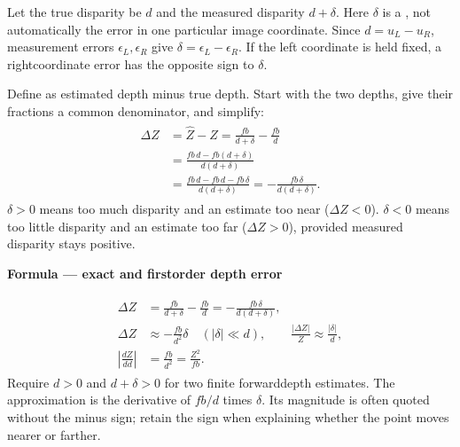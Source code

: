 \documentclass[letterpaper,11pt,english,openany,oneside]{jupyterBook}
\begin{document}
\sphinxAtStartPar
Let the true disparity be \(d\) and the measured disparity \(d+\delta\). Here \(\delta\) is a , not automatically the error in one particular image coordinate. Since \(d=u_L-u_R\), measurement errors \(\epsilon_L,\epsilon_R\) give \(\delta=\epsilon_L-\epsilon_R\). If the left coordinate is held fixed, a right\sphinxhyphen{}coordinate error has the opposite sign to \(\delta\).

\sphinxAtStartPar
Define  as estimated depth minus true depth. Start with the two depths, give their fractions a common denominator, and simplify:
\begin{equation*}
\begin{split}
\begin{aligned}
\Delta Z&=\widehat Z-Z=\frac{fb}{d+\delta}-\frac{fb}{d}\\
&=\frac{fb\,d-fb(d+\delta)}{d(d+\delta)}\\
&=\frac{fb\,d-fb\,d-fb\,\delta}{d(d+\delta)}
=-\frac{fb\,\delta}{d(d+\delta)}.
\end{aligned}
\end{split}
\end{equation*}
\sphinxAtStartPar
{} \(\delta>0\) means too much disparity and an estimate too near (\(\Delta Z<0\)). \(\delta<0\) means too little disparity and an estimate too far (\(\Delta Z>0\)), provided measured disparity stays positive.

\begin{TextbookBox}
\textbf{Formula — exact and first\sphinxhyphen{}order depth error}\par\smallskip
\begin{equation}\label{equation:lectures/lecture04/stereo:eq-lec04-depth-error}
\begin{split}\begin{aligned}
\Delta Z&=\frac{fb}{d+\delta}-\frac{fb}{d}
=-\frac{fb\,\delta}{d(d+\delta)},\\
\Delta Z&\approx-\frac{fb}{d^2}\delta\quad (|\delta|\ll d),\qquad
\frac{|\Delta Z|}{Z}\approx\frac{|\delta|}{d},\\
\left|\frac{dZ}{dd}\right|&=\frac{fb}{d^2}=\frac{Z^2}{fb}.
\end{aligned}\end{split}
\end{equation}
\sphinxAtStartPar
Require \(d>0\) and \(d+\delta>0\) for two finite forward\sphinxhyphen{}depth estimates. The approximation is the derivative of \(fb/d\) times \(\delta\). Its magnitude is often quoted without the minus sign; retain the sign when explaining whether the point moves nearer or farther.

\end{TextbookBox}
\end{document}
